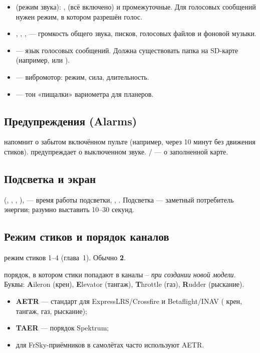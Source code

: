 \begin{itemize}
  \item {} (режим звука): ,  (всё включено) и
        промежуточные. Для голосовых сообщений нужен режим, в котором разрешён голос.
  \item {}, , ,  ---
        громкость общего звука, писков, голосовых файлов и фоновой музыки.
  \item {} --- язык голосовых сообщений. Должна существовать папка
         на SD-карте (например,  или ).
  \item {} --- вибромотор: режим, сила, длительность.
  \item {} --- тон «пищалки» вариометра для планеров.
\end{itemize}

\subsection{Предупреждения (Alarms)}

 напомнит о забытом включённом пульте (например, через 10 минут
без движения стиков).  предупреждает о выключенном звуке.
/ --- о заполненной карте.

\subsection{Подсветка и экран}

 (, , , ),
 --- время работы подсветки, , .
Подсветка --- заметный потребитель энергии; разумно выставить 10--30 секунд.

\subsection{Режим стиков и порядок каналов}

\begin{description}[font=\sffamily\bfseries\color{etx}]
  \item[Mode] режим стиков 1--4 (глава~1). Обычно \textbf{2}.
  \item[Default channel order] порядок, в котором стики попадают в каналы --
        \emph{при создании новой модели}. Буквы: \textbf{A}ileron (крен), \textbf{E}levator
        (тангаж), \textbf{T}hrottle (газ), \textbf{R}udder (рыскание).
        \begin{itemize}
          \item \textbf{AETR} --- стандарт для ExpressLRS/Crossfire и Betaflight/INAV
                ( крен,  тангаж,  газ,  рыскание);
          \item \textbf{TAER} --- порядок Spektrum;
          \item для FrSky-приёмников в самолётах часто используют AETR.
        \end{itemize}
\end{description}

